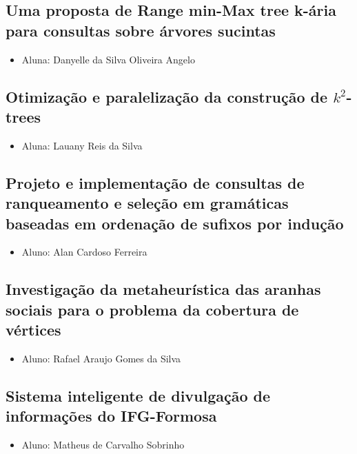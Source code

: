 \documentclass{article}
\newcommand*{\nsubsection}[1]{
    \subsection*{#1}
}
\begin{document}
\nsubsection{Uma proposta de Range min-Max tree k-ária para consultas sobre
árvores sucintas}

\begin{itemize}
	\item Aluna: Danyelle da Silva Oliveira Angelo
\end{itemize}

\nsubsection{Otimização e paralelização da construção de $k^2$-trees}

\begin{itemize}
	\item Aluna: Lauany Reis da Silva
\end{itemize}

\nsubsection{Projeto e implementação de consultas de ranqueamento e seleção em gramáticas baseadas em ordenação de sufixos por indução}

\begin{itemize}
	\item Aluno: Alan Cardoso Ferreira
\end{itemize}

\nsubsection{Investigação da metaheurística das aranhas sociais para o problema da cobertura de vértices}

\begin{itemize}
	\item Aluno: Rafael Araujo Gomes da Silva
\end{itemize}

\nsubsection{Sistema inteligente de divulgação de informações do IFG-Formosa}

\begin{itemize}
	\item Aluno: Matheus de Carvalho Sobrinho
\end{itemize}
\end{document}
